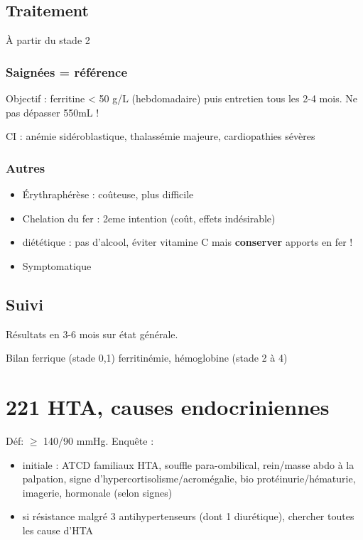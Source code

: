 \documentclass{book}
\begin{document}
\subsection{Traitement}
\label{sec:org4aa2513}
À partir du stade 2

\subsubsection{Saignées = référence}
\label{sec:org67e05f8}
Objectif : ferritine < 50 g/L (hebdomadaire) puis entretien tous les
  2-4 mois. Ne pas dépasser 550mL !

CI : anémie sidéroblastique, thalassémie majeure, cardiopathies sévères

\subsubsection{Autres}
\label{sec:org5c9e0c1}
\begin{itemize}
\item Érythraphérèse : coûteuse, plus difficile
\item Chelation du fer : 2eme intention (coût, effets indésirable)
\item diététique : pas d'alcool, éviter vitamine C mais \textbf{conserver} apports en fer !
\item Symptomatique
\end{itemize}

\subsection{Suivi}
\label{sec:orgba3882a}
Résultats en 3-6 mois sur état générale. 

Bilan ferrique (stade 0,1) ferritinémie, hémoglobine (stade 2 à 4)

\section{221 HTA, causes endocriniennes}
\label{sec:org28789a9}
Déf: \(\ge\) 140/90 mmHg.
Enquête :
\begin{itemize}
\item initiale : ATCD familiaux HTA, souffle para-ombilical, rein/masse abdo à la
palpation, signe d'hypercortisolisme/acromégalie, bio \thus
protéinurie/hématurie, imagerie, hormonale (selon signes)
\item si résistance malgré 3 antihypertenseurs (dont 1 diurétique), chercher toutes
les cause d'HTA
\end{itemize}
\end{document}
